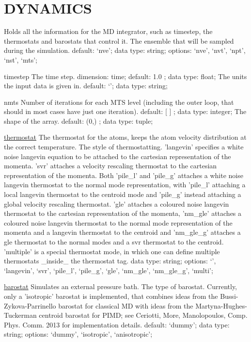 \section{DYNAMICS}
\label{DYNAMICS}
\begin{ipifield}{}%
{Holds all the information for the MD integrator, such as timestep, the thermostats and barostats that control it.}%
{}%
{%
{The ensemble that will be sampled during the simulation. }%
{default: `nve'; data type: string; options: `nve', `nvt', `npt', `nst', `mts'; }%
}
\begin{ipifield}{timestep}%
{The time step.}%
{dimension: time; default:  1.0 ; data type: float; }%
{%
{The units the input data is given in.}%
{default: `'; data type: string; }%
}
\end{ipifield}
\begin{ipifield}{nmts}%
{Number of iterations for each MTS level (including the outer loop, that should in most cases have just one iteration).}%
{default:  [ ] ; data type: integer; }%
{%
{The shape of the array.}%
{default:  (0,) ; data type: tuple; }%
}
\end{ipifield}
\begin{ipifield}{\hyperref[THERMOSTATS]{thermostat}}%
{The thermostat for the atoms, keeps the atom velocity distribution at the correct temperature.}%
{}%
{%
{The style of thermostatting. 'langevin' specifies a white noise langevin equation to be attached to the cartesian representation of the momenta. 'svr' attaches a velocity rescaling thermostat to the cartesian representation of the momenta. Both 'pile\_l' and 'pile\_g' attaches a white noise langevin thermostat to the normal mode representation, with 'pile\_l' attaching a local langevin thermostat to the centroid mode and 'pile\_g' instead attaching a global velocity rescaling thermostat. 'gle' attaches a coloured noise langevin thermostat to the cartesian representation of the momenta, 'nm\_gle' attaches a coloured noise langevin thermostat to the normal mode representation of the momenta and a langevin thermostat to the centroid and 'nm\_gle\_g' attaches a gle thermostat to the normal modes and a svr thermostat to the centroid.  'multiple' is a special thermostat mode, in which one can define multiple thermostats \_inside\_ the thermostat tag.}%
{data type: string; options: `', `langevin', `svr', `pile\_l', `pile\_g', `gle', `nm\_gle', `nm\_gle\_g', `multi'; }%
}
\end{ipifield}
\begin{ipifield}{\hyperref[BAROSTAT]{barostat}}%
{Simulates an external pressure bath.}%
{}%
{%
{The type of barostat.  Currently, only a 'isotropic' barostat is implemented, that combines
                                   ideas from the Bussi-Zykova-Parrinello barostat for classical MD with ideas from the
                                   Martyna-Hughes-Tuckerman centroid barostat for PIMD; see Ceriotti, More, Manolopoulos, Comp. Phys. Comm. 2013 for
                                   implementation details.}%
{default: `dummy'; data type: string; options: `dummy', `isotropic', `anisotropic'; }%
}
\end{ipifield}
\end{ipifield}
